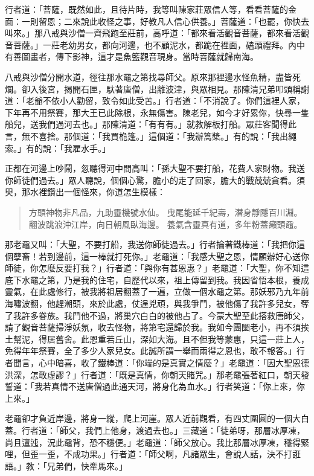 行者道：「菩薩，既然如此，且待片時，我等叫陳家莊眾信人等，看看菩薩的金面：一則留恩；二來說此收怪之事，好教凡人信心供養。」菩薩道：「也罷，你快去叫來。」那八戒與沙僧一齊飛跑至莊前，高呼道：「都來看活觀音菩薩，都來看活觀音菩薩。」一莊老幼男女，都向河邊，也不顧泥水，都跪在裡面，磕頭禮拜。內中有善圖畫者，傳下影神，這才是魚籃觀音現身。當時菩薩就歸南海。

八戒與沙僧分開水道，徑往那水黿之第找尋師父。原來那裡邊水怪魚精，盡皆死爛。卻入後宮，揭開石匣，馱著唐僧，出離波津，與眾相見。那陳清兄弟叩頭稱謝道：「老爺不依小人勸留，致令如此受苦。」行者道：「不消說了。你們這裡人家，下年再不用祭賽，那大王已此除根，永無傷害。陳老兒，如今才好累你，快尋一隻船兒，送我們過河去也。」那陳清道：「有有有。」就教解板打船。眾莊客聞得此言，無不喜捨。那個道：「我買桅篷。」這個道：「我辦篙槳。」有的說：「我出繩索。」有的說：「我雇水手。」

正都在河邊上吵鬧，忽聽得河中間高叫：「孫大聖不要打船，花費人家財物。我送你師徒們過去。」眾人聽說，個個心驚，膽小的走了回家，膽大的戰兢兢貪看。須臾，那水裡鑽出一個怪來，你道怎生模樣：
\begin{quote}
方頭神物非凡品，九助靈機號水仙。
曳尾能延千紀壽，潛身靜隱百川淵。
翻波跳浪沖江岸，向日朝風臥海邊。
養氣含靈真有道，多年粉蓋癩頭黿。
\end{quote}

那老黿又叫：「大聖，不要打船，我送你師徒過去。」行者掄著鐵棒道：「我把你這個孽畜！若到邊前，這一棒就打死你。」老黿道：「我感大聖之恩，情願辦好心送你師徒，你怎麼反要打我？」行者道：「與你有甚恩惠？」老黿道：「大聖，你不知這底下水黿之第，乃是我的住宅，自歷代以來，祖上傳留到我。我因省悟本根，養成靈氣，在此處修行，被我將祖居翻蓋了一遍，立做一個水黿之第。那妖邪乃九年前海嘯波翻，他趕潮頭，來於此處，仗逞兇頑，與我爭鬥，被他傷了我許多兒女，奪了我許多眷族。我鬥他不過，將巢穴白白的被他占了。今蒙大聖至此搭救唐師父，請了觀音菩薩掃淨妖氛，收去怪物，將第宅還歸於我。我如今團圞老小，再不須挨土幫泥，得居舊舍。此恩重若丘山，深如大海。且不但我等蒙惠，只這一莊上人，免得年年祭賽，全了多少人家兒女。此誠所謂一舉而兩得之恩也，敢不報答。」行者聞言，心中暗喜，收了鐵棒道：「你端的是真實之情麼？」老黿道：「因大聖恩德洪深，怎敢虛謬？」行者道：「既是真情，你朝天賭咒。」那老黿張著紅口，朝天發誓道：「我若真情不送唐僧過此通天河，將身化為血水。」行者笑道：「你上來，你上來。」

老黿卻才負近岸邊，將身一縱，爬上河崖。眾人近前觀看，有四丈圍圓的一個大白蓋。行者道：「師父，我們上他身，渡過去也。」三藏道：「徒弟呀，那層冰厚凍，尚且邅迍，況此黿背，恐不穩便。」老黿道：「師父放心。我比那層冰厚凍，穩得緊哩，但歪一歪，不成功果。」行者道：「師父啊，凡諸眾生，會說人話，決不打誑語。」教：「兄弟們，快牽馬來。」

